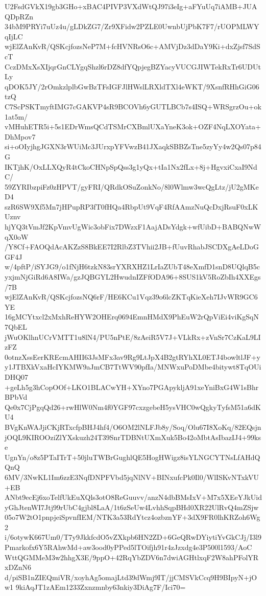 U2FsdGVkX19gb3GHo+xBAC4PIVP3VXdWtQJ97i3eIg+aFYuUq7iAMB+JUAQDpRZn
34bM9PRYi7uUz4u/gLDkZG7/Zr9XFidw2PZLE0UwnbUjPbK7F7/rUOPMLWYqIjLC
wjElZAnKvR/QSKcjfozsNeP7M+fcHVNRsO6c+AMVjDz3dDaY9Ki+dxZjsf7SdScT
CczDMxXsXIjqrGnCLYgqShzl6rDZ8dfYQpjegBZYacyVUCGJIWTekRxTr6UDUtLy
qDOK5JY/2rOmkzlplbGwBzTFsIGFJlHWslLRXldTXl4eWKT/9XsnfRHhGiG06tzQ
C7ScPSKTmyftIMG7cGAKVP4sR9BCOVh6yGUTLBCb7s4ISQ+WRSgrzOu+ok1at5m/
vMHuhETR5i+5s1EDrWmsQCdTSMrCXBmlUXaYneK3ok+OZF4NqLXOYata+DhMpov7
si+oOIyjhgJGXN3rWUiMc3JUrxpYFVwzB41JXaqkSBBZsTne5zyYy4w2Qs07p84G
IKTjhK/OxLLXQyR4tCkoCHNpSpQss3g1yQx+tIa1Nx2fLx+8j+HgvxiCxaI9NdC/
59ZYRIbzpiFz0zHPVT/gyFRI/QRdkOSuZonkNo/8l0Wlmw3wcQgLtz/jU2gMKeD4
szR6SW9Xf5Mn7jHPupRP3fT0fHQa4RbpUt9VqF4RfAAmzNuQcDxjRsuF0xLKUznv
hjYQ3tVmJf2KpVmvUgWic3obFix7DWzxF1AajADsYdgk+wfUibD+BABQNwWqX0oW
/Y8Cf+FAOQdAcAKZzS8BkEE7I2RlbZ3TVhii2JB+fUuvRhabJSCDXgAeLDoGGF4J
w/4pftP/iSYJG9/o1fNjH6tzkN83srYXRXHZ1LrIaZUbT48eXmfD1snD8UQlqB5c
yxjmNjGiRd6A8IWa/gzJQBGYL2HwudnIZFfODA96+8SUS1kV5RoZbIh4XXEgs/7B
wjElZAnKvR/QSKcjfozsNQ6rF/HE6KCu1Vqz39o6lcZKTqKieXeh7IJvWR9GC6YE
16gMCYtxcl2xMxhReHYW2OHErq0694EmnHMdX9PhEuW2rQpViEi4viKgSqN7QbEL
jWuOKlhnUCrVMTT1u8lN4/PU5nPtE/8zAeiR5V7J+VLkRx+zVnSr7CzKaL9LIzFZ
0otnzXssEerKREcmAHII63JsMFx3av9Rg9LtJpX4B2gtRYhXL0ETJ4bowltlJF+y
y1JTBXkVxaHcIYKMW9aJmCB7TtWV90pfIa/MNWxuPoDMbe4bitywt8TqOUiDHQ07
+geLh5g3hCopOOf+LKO1BLACwYH+XYno7PGApykljA91xeYniBxG4W1sBhrBPbVd
Qe0x7CjPgqQd26+rwHlW0Nm4f0YGF97cxzgebeH5ysVHC0wQgkyTyfsM51a6dKU4
BVgKnWAJjiCKjRTxcfpBHJ4hf4/O6OM2lNLFJb8y/Soq/Olu67I8XoKq/82EQsjn
jOQL9KIROOziZlYXskuzh24T39SnrTDBNtUXmXuk5Bo42oMbtAsIbazIJ4+99kse
UgnYn/o8z5PTaITrT+50jluTWBrGughlQE5HogHWigz8isYLNGCYTNsLfAHdQQnQ
6MV/3NwKL1Im6zzE3NqfDNPFVbd5jqNlNV+BINxufcPk0Il0/WlISKvNTxkVU+EB
ANbt9ecEj6xoTelfUkEuXQls3otO8ReGuuvv/anzN4dbBMsIxV+M7x5XEeYJkUid
yGhJtenWI7Jtj99rUbC4gjbl8LaA/1t6zSeUw4LvhhSqpBHd0XR22UlRvQ4mZSjw
05o7W2tO1pnpjeiSpvnfIEM/NTK3a53RdYtcz4ozbznYF+3dX9FR0lhKRZoh6Wg2
i/6otywK667Um0/T7y9JkkfcdO5vZXkpb6HN2ZD+6GeQRwDYiytiYvGkCJj/I3l9
Pmarkofx6Y5RAhwMd+aw3ood0yPPed5lTOifjh91r4zJzxdg4e3P500l1593/AoC
WttQGMMeM3w2hhgX3E/9ppO+42RqYbZDV6n7dwiAGHtlxqF2W8ahPFolYRxDZnN6
d/piSB1nZIEQmiVR/xoyhAg5omajLtd39dWmj9IT/jjCMSVkCcq9H9BIpyN+jOw1
9kiAqJT1zAEm1233Zxnzmnby63nkiy3DiAg7F/Ici70=
